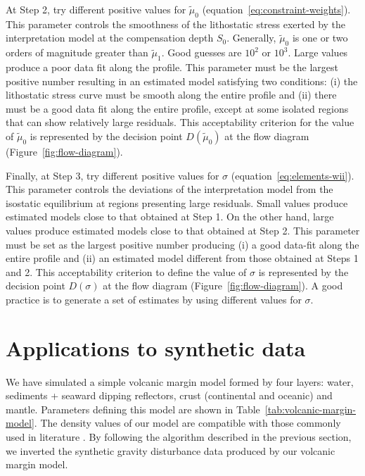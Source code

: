 \documentclass[manuscript]{geophysics}
\begin{document}
At Step 2, try different positive values for $\tilde{\mu}_{0}$ 
(equation~\ref{eq:constraint-weights}). This parameter
controls the smoothness of the lithostatic stress exerted by the interpretation model
at the compensation depth $S_{0}$. Generally, $\tilde{\mu}_{0}$ is one or two 
orders of magnitude greater than $\tilde{\mu}_{1}$. 
Good guesses are $10^{2}$ or $10^{3}$.
Large values produce a poor data fit along the profile.
This parameter must be the largest positive number resulting in an estimated
model satisfying two conditions: (i) the lithostatic stress curve must be smooth
along the entire profile and (ii) there must be a good data fit along the entire
profile, except at some isolated regions that can show relatively large residuals.
This acceptability criterion for the value of $\tilde{\mu}_{0}$ is
represented by the decision point $D(\tilde{\mu}_{0})$ 
at the flow diagram (Figure~\ref{fig:flow-diagram}).

Finally, at Step 3, try different positive values for $\sigma$ (equation~\ref{eq:elements-wii}).
This parameter controls the deviations of the interpretation model from the
isostatic equilibrium at regions presenting large residuals.
Small values produce estimated models close to that obtained at Step 1.
On the other hand, large values produce estimated models close to that
obtained at Step 2.
This parameter must be set as the largest positive number producing (i) a good data-fit
along the entire profile and (ii) an estimated model different from those obtained
at Steps 1 and 2.
This acceptability criterion to define the value of $\sigma$ is
represented by the decision point $D(\sigma)$ 
at the flow diagram (Figure~\ref{fig:flow-diagram}).
A good practice is to generate a set of estimates by using different 
values for $\sigma$. 


\section{Applications to synthetic data}


We have simulated a simple volcanic margin model formed by four layers: 
water, sediments + seaward dipping reflectors, crust (continental and oceanic) 
and mantle. 
Parameters defining this model are shown in Table~\ref{tab:volcanic-margin-model}.
The density values of our model are compatible with those commonly used in literature
\citep[e.g., ][]{gradmann-etal2017}.
By following the algorithm described in the previous section, we inverted the synthetic 
gravity disturbance data produced by our volcanic margin model.
\end{document}
